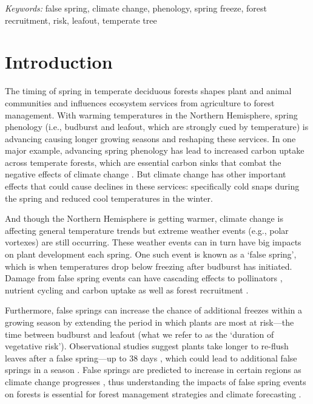 \documentclass{article}\usepackage[]{graphicx}\usepackage[]{color}
\begin{document}
\vspace{2ex}
\textit{Keywords:} false spring, climate change, phenology, spring freeze, forest recruitment, risk, leafout, temperate tree

\section*{Introduction}
The timing of spring in temperate deciduous forests shapes plant and animal communities and influences ecosystem services from agriculture to forest management. With warming temperatures in the Northern Hemisphere, spring phenology (i.e., budburst and leafout, which  are strongly cued by temperature) is advancing causing longer growing seasons \citep{Chuine2001} and reshaping these services. In one major example, advancing spring phenology has lead to increased carbon uptake across temperate forests, which are essential carbon sinks that combat the negative effects of climate change \citep{Keenan2014}. But climate change has other important effects that could cause declines in these services: specifically cold snaps during the spring and reduced cool temperatures in the winter.
  
And though the Northern Hemisphere is getting warmer, climate change is affecting general temperature trends but extreme weather events (e.g., polar vortexes) are still occurring. These weather events can in turn have big impacts on plant development each spring. One such event is known as a `false spring', which is when temperatures drop below freezing \citep[][i.e., below -2.2$^{\circ}$C]{Schwartz2002} after budburst has initiated. Damage from false spring events can have cascading effects to pollinators \citep{Boggs2012, Pardee2017}, nutrient cycling and carbon uptake as well as forest recruitment \citep{Hufkens2012, Klosterman2018, Richardson2013}.

Furthermore, false springs can increase the chance of additional freezes within a growing season by extending the period in which plants are most at risk---the time between budburst and leafout (what we refer to as the `duration of vegetative risk'). Observational studies suggest plants take longer to re-flush leaves after a false spring---up to 38 days \citep{Augspurger2009, Augspurger2013, Gu2008, Menzel2015}, which could lead to additional false springs in a season \citep{Augspurger2009}. False springs are predicted to increase in certain regions as climate change progresses \citep{Ault2015, Liu2018, Zohner2020}, thus understanding the impacts of false spring events on forests is essential for forest management strategies and climate forecasting \citep{OBrien2019}.
  
\end{document}
